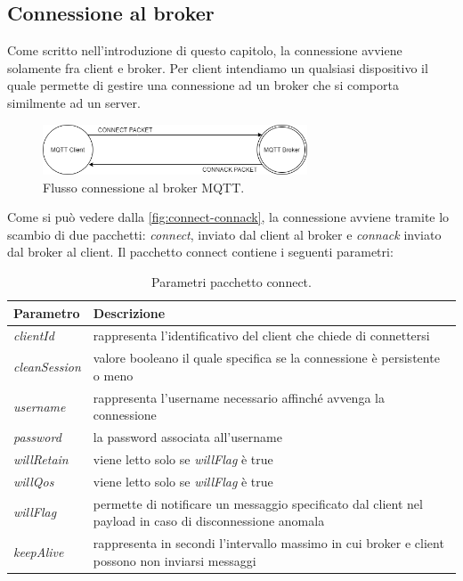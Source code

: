 \documentclass[binding=0.6cm,TFA]{sapthesis}
\begin{document}
\begin{large}
\subsection{Connessione al broker}
Come scritto nell'introduzione di questo capitolo, la connessione avviene solamente fra client e broker. Per client intendiamo un qualsiasi dispositivo il quale permette di gestire una connessione ad un broker che si comporta similmente ad un server. 

\begin{figure}[h]
\centering
\includegraphics[width=0.7\textwidth]{images/connect-connack.png}
\caption{Flusso connessione al broker MQTT.}
\label{fig:connect-connack}
\end{figure}

Come si può vedere dalla \autoref{fig:connect-connack}, la connessione avviene tramite lo scambio di due pacchetti: \textit{connect}, inviato dal client al broker e \textit{connack} inviato dal broker al client. Il pacchetto connect contiene i seguenti parametri:
\begin{table}[h]
\caption{Parametri pacchetto connect.}
\label{tab:connect}
\begin{tabular}{lp{}}
\toprule
\textbf{Parametro} & \textbf{Descrizione} \\
\midrule
\textit{clientId} & rappresenta l'identificativo del client che chiede di connettersi \\
\textit{cleanSession} & valore booleano il quale specifica se la connessione è persistente o meno \\
\textit{username} & rappresenta l'username necessario affinché avvenga la connessione \\
\textit{password} & la password associata all'username \\
\textit{willRetain} & viene letto solo se \textit{willFlag} è true \\
\textit{willQos} & viene letto solo se \textit{willFlag} è true \\
\textit{willFlag} & permette di notificare un messaggio specificato dal client nel payload in caso di disconnessione anomala \\
\textit{keepAlive} & rappresenta in secondi l'intervallo massimo in cui broker e client possono non inviarsi messaggi \\
\bottomrule
\end{tabular}
\end{table}


\end{large}
\end{document}

